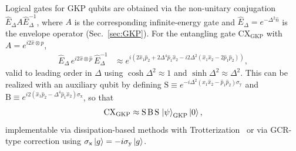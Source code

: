 \documentclass[aps,prx,showpacs,notitlepage,twocolumn,superscriptaddress,nofootinbib,preprintnumbers,floatfix,10pt, longbibliography]{revtex4-2}
\begin{document}
{Logical gates for GKP qubits are obtained via the non-unitary conjugation
$\hat{E}_\Delta A\hat{E}_\Delta^{-1}$, where $A$ is the corresponding
infinite-energy gate and $\hat{E}_\Delta=e^{-\Delta^2\hat{n}}$ is the
envelope operator (Sec.~\ref{sec:GKP}).  For the entangling gate
$\mathrm{CX}_\mathrm{GKP}$ with $A=e^{i2\hat{x}\otimes\hat{p}}$,
\begin{align}
  \hat{E}_\Delta\, e^{i2\hat{x}\otimes\hat{p}}\,\hat{E}_\Delta^{-1}
  &\approx e^{i(2\hat{x}_1\hat{p}_2
              +2\Delta^4\hat{p}_1\hat{x}_2
              -i2\Delta^2(\hat{x}_1\hat{x}_2
              -2\hat{p}_1\hat{p}_2))},
\end{align}
valid to leading order in $\Delta$ using $\cosh\Delta^2\approx 1$ and
$\sinh\Delta^2\approx\Delta^2$.  This can be realized with an auxiliary
qubit by defining $\mathrm{S}\equiv e^{-i\Delta^2(\hat{x}_1\hat{x}_2
-\hat{p}_1\hat{p}_2)\sigma_\mathrm{y}}$ and $\mathrm{B}\equiv
e^{i2(\hat{x}_1\hat{p}_2-\Delta^4\hat{p}_1\hat{x}_2)\sigma_\mathrm{x}}$,
so that
\begin{align}
  \mathrm{CX}_\mathrm{GKP}
  \approx \mathrm{S}\,\mathrm{B}\,\mathrm{S}\,\ket{\psi}_\mathrm{GKP}\ket{0},
\end{align}
implementable via dissipation-based methods with Trotterization~\cite{royer2020stabilization,rojkov2023two}
or via GCR-type correction using $\sigma_\mathrm{x}\ket{g}=-i\sigma_\mathrm{y}\ket{g}$.

}
\end{document}
